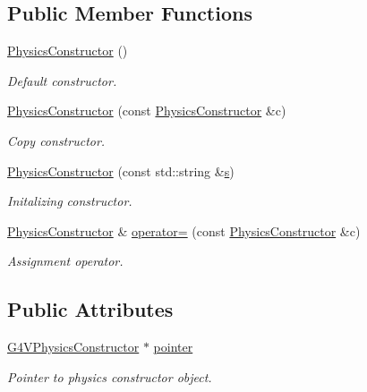\subsection*{Public Member Functions}
\begin{DoxyCompactItemize}
\item 
\hyperlink{class_d_d4hep_1_1_simulation_1_1_geant4_physics_list_1_1_physics_constructor_a3c66a1cc69a9c2b3d8a4c2febcd17ceb}{PhysicsConstructor} ()
\begin{DoxyCompactList}\small\item\em Default constructor. \item\end{DoxyCompactList}\item 
\hyperlink{class_d_d4hep_1_1_simulation_1_1_geant4_physics_list_1_1_physics_constructor_a6dd26f324ed74b412c93e8d555939c68}{PhysicsConstructor} (const \hyperlink{class_d_d4hep_1_1_simulation_1_1_geant4_physics_list_1_1_physics_constructor}{PhysicsConstructor} \&c)
\begin{DoxyCompactList}\small\item\em Copy constructor. \item\end{DoxyCompactList}\item 
\hyperlink{class_d_d4hep_1_1_simulation_1_1_geant4_physics_list_1_1_physics_constructor_a38411ded2599196e9a79aa2abb72cc66}{PhysicsConstructor} (const std::string \&\hyperlink{_volumes_8cpp_a17ca6bfc8040d695d3cada22a4763d40}{s})
\begin{DoxyCompactList}\small\item\em Initalizing constructor. \item\end{DoxyCompactList}\item 
\hyperlink{class_d_d4hep_1_1_simulation_1_1_geant4_physics_list_1_1_physics_constructor}{PhysicsConstructor} \& \hyperlink{class_d_d4hep_1_1_simulation_1_1_geant4_physics_list_1_1_physics_constructor_a05c1b02c48b71ab46e1cbe56f059f9b7}{operator=} (const \hyperlink{class_d_d4hep_1_1_simulation_1_1_geant4_physics_list_1_1_physics_constructor}{PhysicsConstructor} \&c)
\begin{DoxyCompactList}\small\item\em Assignment operator. \item\end{DoxyCompactList}\end{DoxyCompactItemize}
\subsection*{Public Attributes}
\begin{DoxyCompactItemize}
\item 
\hyperlink{class_g4_v_physics_constructor}{G4VPhysicsConstructor} $\ast$ \hyperlink{class_d_d4hep_1_1_simulation_1_1_geant4_physics_list_1_1_physics_constructor_a30d7b232e1e35f1eb610c375a9e9e774}{pointer}
\begin{DoxyCompactList}\small\item\em Pointer to physics constructor object. \item\end{DoxyCompactList}\end{DoxyCompactItemize}



